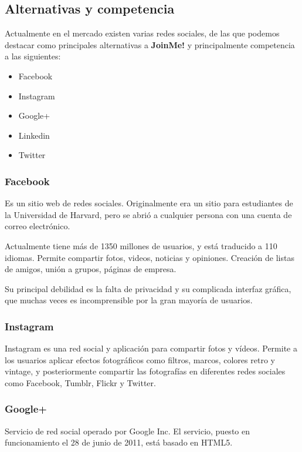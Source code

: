 \documentclass[12pt, a4paper, titlepage]{article}
\begin{document}
\subsection{Alternativas y competencia}

Actualmente en el mercado existen varias redes sociales, de las que podemos destacar como principales alternativas a \textbf{JoinMe!} y principalmente competencia a las siguientes:

\begin{itemize}
\item Facebook
\item Instagram
\item Google+
\item Linkedin
\item Twitter
\end{itemize}

\subsubsection{Facebook}
Es un sitio web de redes sociales. Originalmente era un sitio para estudiantes de la Universidad de Harvard, pero se abrió a cualquier persona con una cuenta de correo electrónico.

Actualmente tiene más de 1350 millones de usuarios, y está traducido a 110 idiomas. Permite compartir fotos, videos, noticias y opiniones. Creación de listas de amigos, unión a grupos, páginas de empresa.

Su principal debilidad es la falta de privacidad y su complicada interfaz gráfica, que  muchas veces es incomprensible por la gran mayoría de usuarios.

\subsubsection{Instagram}
Instagram es una red social y aplicación para compartir fotos y vídeos. Permite a los usuarios aplicar efectos fotográficos como filtros, marcos, colores retro y vintage, y posteriormente compartir las fotografías en diferentes redes sociales como Facebook, Tumblr, Flickr y Twitter.

\subsubsection{Google+}
Servicio de red social operado por Google Inc. El servicio, puesto en funcionamiento el 28 de junio de 2011, está basado en HTML5.
\end{document}
